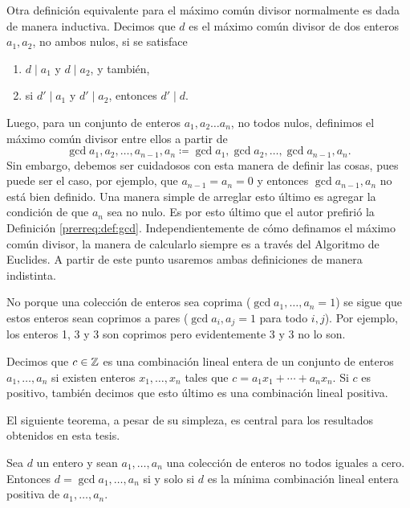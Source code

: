 Otra definición equivalente para el máximo común divisor normalmente es dada de manera inductiva.
Decimos que $d$ es el máximo común divisor de dos enteros $a_1, a_2$, no ambos nulos, si se
satisface
\begin{enumerate}
	\item $d \mid a_1$ y $d \mid a_2$, y también,
	\item si $d' \mid a_1$ y $d' \mid a_2$, entonces $d' \mid d$.
\end{enumerate}
Luego, para un conjunto de enteros $a_1, a_2 \ldots a_n$, no todos nulos, definimos el máximo común
divisor entre ellos a partir de
\begin{equation*}
	\gcd{a_1, a_2, \ldots, a_{n-1}, a_n} \coloneq \gcd{a_1, \gcd{a_2, \ldots, \gcd{a_{n-1}, a_n}}}.
\end{equation*}
Sin embargo, debemos ser cuidadosos con esta manera de definir las cosas, pues puede ser el caso,
por ejemplo, que $a_{n-1} = a_n = 0$ y entonces $\gcd{a_{n-1}, a_n}$ no está bien definido. Una
manera simple de arreglar esto último es agregar la condición de que $a_n$ sea no nulo. Es por esto
último que el autor prefirió la Definición \ref{prerreq:def:gcd}. Independientemente de cómo
definamos el máximo común divisor, la manera de calcularlo siempre es a través del Algoritmo de
Euclides. A partir de este punto usaremos ambas definiciones de manera indistinta.

\begin{observation}
	No porque una colección de enteros sea coprima ($\gcd{a_1, \ldots, a_n} = 1$) se sigue que
	estos enteros sean coprimos a pares ($\gcd{a_i, a_j} = 1$ para todo $i, j$). Por ejemplo,
	los enteros 1, 3 y 3 son coprimos pero evidentemente 3 y 3 no lo son.
\end{observation}

\begin{definition}
	Decimos que $c \in \mathbb{Z}$ es una combinación lineal entera de un conjunto de enteros $a_1, \ldots,
	a_n$ si existen enteros $x_1, \ldots, x_n$ tales que $c = a_1x_1 + \cdots + a_nx_n$. Si $c$ es
	positivo, también decimos que esto último es una combinación lineal positiva.
\end{definition}

El siguiente teorema, a pesar de su simpleza, es central para los resultados obtenidos en esta
tesis.
\begin{theorem}
	\label{prerreq:th:bezout}
	Sea $d$ un entero y sean $a_1, \ldots, a_n$ una colección de enteros no todos iguales a cero.
	Entonces $d = \gcd{a_1, \ldots, a_n}$ si y solo si $d$ es la mínima combinación lineal entera
	positiva de $a_1, \ldots, a_n$.
\end{theorem}

